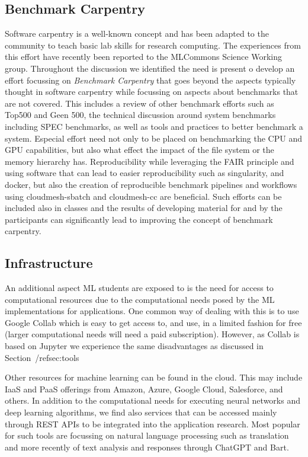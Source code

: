 \documentclass[utf8]{FrontiersinVancouver} %
\begin{document}
\subsection{Benchmark Carpentry}

Software carpentry \citep{software-carpentry} is a well-known concept
and has been adapted to the community to teach basic lab skills for
research computing.  The experiences from this effort have recently
been reported to the MLCommons Science Working group. Throughout
the discussion we identified the need is present o develop an effort
focussing on {\em Benchmark Carpentry} that goes beyond the aspects
typically thought in software carpentry while focussing on aspects
about benchmarks that are not covered. This includes a review of other
benchmark efforts such as Top500 and Geen 500, the technical
discussion around system benchmarks including SPEC benchmarks, as
well as tools and practices to better benchmark a system. Especial
effort need not only to be placed on benchmarking the CPU and GPU
capabilities, but also what effect the impact of the file system or
the memory hierarchy has. Reproducibility while leveraging the FAIR
principle and using software that can lead to easier reproducibility
such as singularity, and docker, but also the creation of reproducible
benchmark pipelines and workflows using cloudmesh-sbatch and
cloudmesh-cc are beneficial. Such efforts can be included also in
classes and the results of developing material for and by the
participants can significantly lead to improving the concept of
benchmark carpentry.

\subsection{Infrastructure}

An additional aspect ML students are exposed to is the need for access
to computational resources due to the computational needs posed by the
ML implementations for applications. One common way of dealing with
this is to use Google Collab which is easy to get access to, and use,
in a limited fashion for free (larger computational needs will need a
paid subscription).  However, as Collab is based on Jupyter we
experience the same disadvantages as discussed in
Section~/ref{sec:tools}

Other resources for machine learning can be found in the cloud. This
may include IaaS and PaaS offerings from Amazon, Azure, Google Cloud,
Salesforce, and others.  In addition to the computational needs for
executing neural networks and deep learning algorithms, we find also
services that can be accessed mainly through REST APIs to be
integrated into the application research. Most popular for such tools
are focussing on natural language processing such as translation and
more recently of text analysis and responses through ChatGPT and Bart.
\end{document}

